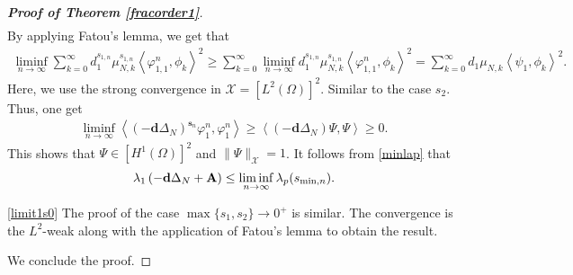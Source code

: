 \documentclass[a4paper,11pt]{amsart}
\theoremstyle{definition}
\def\O{\Omega}
\numberwithin{equation}{section}
\theoremstyle{definition}
\def\O{\Omega}
\begin{document}
\begin{proof}[\bf Proof of Theorem \ref{fracorder1}]
\begin{align*}
\end{align*}
By applying Fatou's lemma, we get that
\begin{align*}
\liminf_{n\rightarrow \infty}\sum_{k=0}^\infty d_1^{s_{1,n}}\mu_{N,k}^{s_{1,n}}\left<\varphi_{1,1}^n,\phi_k\right>^2\geq \sum_{k=0}^\infty \liminf_{n\rightarrow \infty} d_1^{s_{1,n}}\mu_{N,k}^{s_{1,n}}\left<\varphi_{1,1}^n,\phi_k\right>^2= \sum_{k=0}^\infty  d_1\mu_{N,k}\left<\psi_1,\phi_k\right>^2.
\end{align*}
 Here, we use the strong convergence in $\mathcal{X}=[L^2(\O)]^2$. Similar to the case $s_2$. Thus, one get
\begin{align*}
\liminf_{n\rightarrow \infty}\left<(-\textbf{d}\Delta_N)^{\textbf{s}_n}\varphi_1^n,\varphi_1^n\right>\geq \left<(-\textbf{d}\Delta_N)\Psi,\Psi\right>\geq 0.
\end{align*}
This shows that $\Psi \in [H^1(\O)]^2$ and $\|\Psi\|_{\mathcal{X}}=1$. It follows from \eqref{minlap} that
\begin{align*}
\lambda_1\left(-\textbf{d}\Delta_N+ {\bf A}\right)\leq \liminf_{n\rightarrow \infty}\lambda_p(s_{\min,n}).
\end{align*}

\ref{limit1s0} The proof of the case $\max\{s_1,s_2\}\rightarrow 0^+$ is similar. The convergence is the $L^2$-weak along with the application of Fatou's lemma to obtain the result.


We conclude the proof.


\end{proof}

\end{document}
